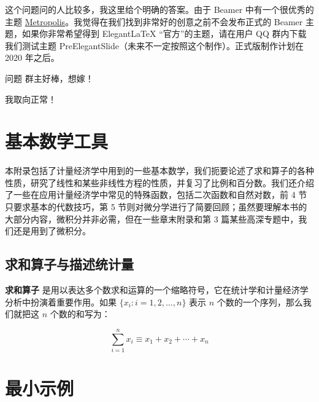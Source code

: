 \documentclass[cn,11pt]{elegantbook}
\begin{document}
\begin{solution}
这个问题问的人比较多，我这里给个明确的答案。由于 Beamer 中有一个很优秀的主题 \href{https://github.com/matze/mtheme}{Metropolis}。我觉得在我们找到非常好的创意之前不会发布正式的 Beamer 主题，如果你非常希望得到 Elegant\LaTeX{} “官方”的主题，请在用户 QQ 群内下载我们测试主题 PreElegantSlide（未来不一定按照这个制作）。正式版制作计划在 2020 年之后。
\end{solution}

\begin{custom}{问题}
群主好棒，想嫁！
\end{custom}

\begin{solution}
我取向正常！
\end{solution}


\nocite{*} 



\appendix
\chapter{基本数学工具}

本附录包括了计量经济学中用到的一些基本数学，我们扼要论述了求和算子的各种性质，研究了线性和某些非线性方程的性质，并复习了比例和百分数。我们还介绍了一些在应用计量经济学中常见的特殊函数，包括二次函数和自然对数，前 4 节只要求基本的代数技巧，第 5 节则对微分学进行了简要回顾；虽然要理解本书的大部分内容，微积分并非必需，但在一些章末附录和第 3 篇某些高深专题中，我们还是用到了微积分。

\section{求和算子与描述统计量}

\textbf{求和算子} 是用以表达多个数求和运算的一个缩略符号，它在统计学和计量经济学分析中扮演着重要作用。如果 $\{x_i: i=1, 2, \ldots, n\}$ 表示 $n$ 个数的一个序列，那么我们就把这 $n$ 个数的和写为：

\begin{equation}
\sum_{i=1}^n x_i \equiv x_1 + x_2 +\cdots + x_n
\end{equation}



\chapter{最小示例}
\end{document}
